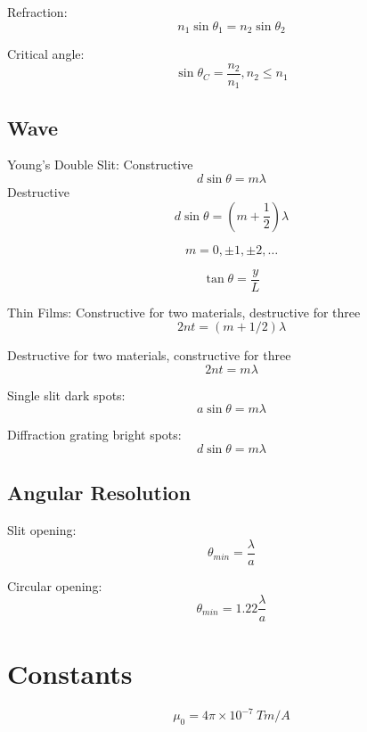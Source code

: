 \documentclass{article}
\begin{document}
	Refraction:
	$$ n_1 \sin\theta_1 = n_2 \sin\theta_2 $$
	
	Critical angle:
	$$ \sin\theta_C = \frac{n_2}{n_1}, n_2 \leq n_1 $$
	
	\subsection{Wave}
	
	Young's Double Slit:
	Constructive
	$$ d\sin\theta = m \lambda $$
	Destructive
	$$ d\sin\theta = (m+\frac{1}{2}) \lambda $$
	
	$$ m = 0, \pm 1, \pm 2, \dots $$
	
	$$ \tan\theta = \frac{y}{L} $$
	
	Thin Films:
	Constructive for two materials, destructive for three
	$$ 2nt = (m + 1/2) \lambda $$
	
	Destructive for two materials, constructive for three
	$$ 2nt = m\lambda $$
	
	Single slit dark spots:
	$$ a\sin\theta = m\lambda $$
	
	Diffraction grating bright spots:
	$$ d\sin\theta = m\lambda $$
	
	\subsection{Angular Resolution}
	
	Slit opening:
	$$ \theta_{min} = 	\frac{\lambda}{a} $$
	
	Circular opening:
	$$ \theta_{min} = 1.22 \frac{\lambda}{a} $$
	
	\section{Constants}
	
	$$ \mu_0 = 4\pi \times 10^{-7} \ Tm/A $$
	
	
	
	
	
	
	
	
	
	
	
	
	
	
	
	
	
	
	
	
	
	
	
	
	
	
	
	
	
	
\end{document}
